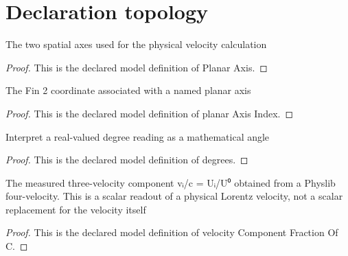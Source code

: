 \section{Declaration topology}
\begin{definition}
  \label{def:physics:phyx-mini-0565:phyxminiproblems-problemphyxmini0565-planaraxis}
  The two spatial axes used for the physical velocity calculation
\end{definition}
\begin{proof}
  This is the declared model definition of Planar Axis.
\end{proof}
\begin{definition}
  \label{def:physics:phyx-mini-0565:phyxminiproblems-problemphyxmini0565-planaraxisindex}
  The Fin 2 coordinate associated with a named planar axis
\end{definition}
\begin{proof}
  This is the declared model definition of planar Axis Index.
\end{proof}
\begin{definition}[degrees]
  \label{def:physics:phyx-mini-0565:phyxminiproblems-problemphyxmini0565-degrees}
  Interpret a real-valued degree reading as a mathematical angle
\end{definition}
\begin{proof}
  This is the declared model definition of degrees.
\end{proof}
\begin{definition}
  \label{def:physics:phyx-mini-0565:phyxminiproblems-problemphyxmini0565-velocitycomponentfractionofc}
  The measured three-velocity component vᵢ/c = Uᵢ/U⁰ obtained from a Physlib four-velocity. This is a scalar readout of a physical Lorentz velocity, not a scalar replacement for the velocity itself
\end{definition}
\begin{proof}
  This is the declared model definition of velocity Component Fraction Of C.
\end{proof}
